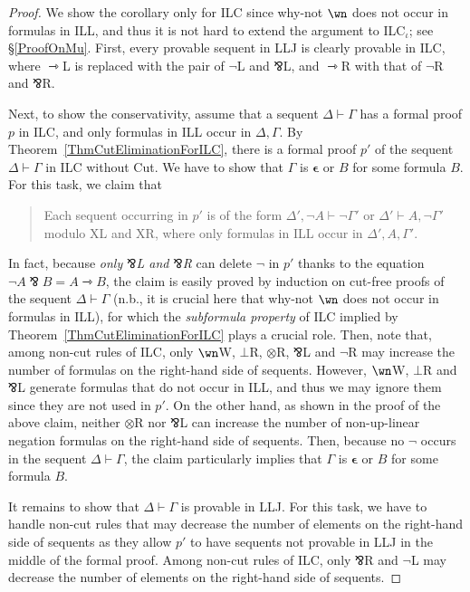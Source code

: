 \documentclass[a4paper]{article}
\theoremstyle{definition}
\theoremstyle{theorem}
\theoremstyle{remark}
\begin{document}
\begin{proof}
We show the corollary only for \textsf{ILC} since why-not $\wn$ does not occur in formulas in ILL, and thus it is not hard to extend the argument to \textsf{ILC$_\iota$}; see \S\ref{ProofOnMu}.
First, every provable sequent in \textsf{LLJ} is clearly provable in \textsf{ILC}, where $\rightarrowtriangle$L is replaced with the pair of $\neg$L and $\invamp$L, and $\rightarrowtriangle$R with that of $\neg$R and $\invamp$R.

Next, to show the conservativity, assume that a sequent $\Delta \vdash \Gamma$ has a formal proof $p$ in \textsf{ILC}, and only formulas in ILL occur in $\Delta, \Gamma$.
By Theorem~\ref{ThmCutEliminationForILC}, there is a formal proof $p'$ of the sequent $\Delta \vdash \Gamma$ in \textsf{ILC} without Cut.
We have to show that $\Gamma$ is $\boldsymbol{\epsilon}$ or $B$ for some formula $B$.
For this task, we claim that
\begin{quote}
Each sequent occurring in $p'$ is of the form $\Delta', \neg A \vdash \neg \Gamma'$ or $\Delta' \vdash A, \neg \Gamma'$ modulo XL and XR, where only formulas in ILL occur in $\Delta', A, \Gamma'$.
\end{quote}

In fact, because \emph{only $\invamp$L and $\invamp$R} can delete $\neg$ in $p'$ thanks to the equation $\neg A \invamp B = A \rightarrowtriangle B$, the claim is easily proved by induction on cut-free proofs of the sequent $\Delta \vdash \Gamma$ (n.b., it is crucial here that why-not $\wn$ does not occur in formulas in ILL), for which the \emph{subformula property} \cite{troelstra2000basic} of \textsf{ILC} implied by Theorem~\ref{ThmCutEliminationForILC} plays a crucial role.
Then, note that, among non-cut rules of \textsf{ILC}, only $\wn$W, $\bot$R, $\otimes$R, $\invamp$L and $\neg$R may increase the number of formulas  on the right-hand side of sequents.
However, $\wn$W, $\bot$R and $\invamp$L generate formulas that do not occur in ILL, and thus we may ignore them since they are not used in $p'$.
On the other hand, as shown in the proof of the above claim, neither $\otimes$R nor $\invamp$L can increase the number of non-up-linear negation formulas on the right-hand side of sequents.
\fi
Then, because no $\neg$ occurs in the sequent $\Delta \vdash \Gamma$, the claim particularly implies that $\Gamma$ is $\boldsymbol{\epsilon}$ or $B$ for some formula $B$.

It remains to show that $\Delta \vdash \Gamma$ is provable in \textsf{LLJ}.
For this task, we have to handle non-cut rules that may decrease the number of elements on the right-hand side of sequents as they allow $p'$ to have sequents not provable in \textsf{LLJ} in the middle of the formal proof.
Among non-cut rules of \textsf{ILC}, only $\invamp$R and $\neg$L may decrease the number of elements on the right-hand side of sequents.


\end{proof}
\end{document}
